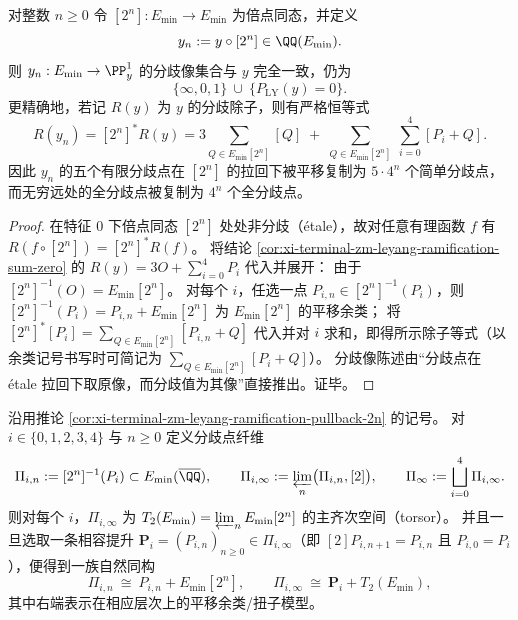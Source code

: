 \begin{corollary}\label{cor:xi-terminal-zm-leyang-ramification-pullback-2n}
对整数 \(n\ge 0\) 令 \([2^n]:E_{\min}\to E_{\min}\) 为倍点同态，并定义
\[
y_n:=y\circ[2^n]\in \QQ(E_{\min}).
\]
则 \(y_n:E_{\min}\to\PP^1_y\) 的分歧像集合与 \(y\) 完全一致，仍为
\[
\{\infty,0,1\}\ \cup\ \{P_{\mathrm{LY}}(y)=0\}.
\]
更精确地，若记 \(R(y)\) 为 \(y\) 的分歧除子，则有严格恒等式
\[
R(y_n)=[2^n]^*R(y)
=3\sum_{Q\in E_{\min}[2^n]}[Q]\;+\;\sum_{Q\in E_{\min}[2^n]}\ \sum_{i=0}^{4}[P_i+Q].
\]
因此 \(y_n\) 的五个有限分歧点在 \([2^n]\) 的拉回下被平移复制为 \(5\cdot 4^n\) 个简单分歧点，而无穷远处的全分歧点被复制为 \(4^n\) 个全分歧点。
\end{corollary}
\begin{proof}
在特征 \(0\) 下倍点同态 \([2^n]\) 处处非分歧（\'etale），故对任意有理函数 \(f\) 有 \(R(f\circ[2^n])=[2^n]^*R(f)\)。
将结论 \ref{cor:xi-terminal-zm-leyang-ramification-sum-zero} 的 \(R(y)=3O+\sum_{i=0}^{4}P_i\) 代入并展开：
由于 \([2^n]^{-1}(O)=E_{\min}[2^n]\)。
对每个 \(i\)，任选一点 \(P_{i,n}\in[2^n]^{-1}(P_i)\)，则 \([2^n]^{-1}(P_i)=P_{i,n}+E_{\min}[2^n]\) 为 \(E_{\min}[2^n]\) 的平移余类；
将 \([2^n]^*[P_i]=\sum_{Q\in E_{\min}[2^n]}[P_{i,n}+Q]\) 代入并对 \(i\) 求和，即得所示除子等式（以余类记号书写时可简记为 \(\sum_{Q\in E_{\min}[2^n]}[P_i+Q]\)）。
分歧像陈述由“分歧点在 \'etale 拉回下取原像，而分歧值为其像”直接推出。证毕。
\end{proof}

\begin{corollary}\label{cor:xi-terminal-zm-leyang-branchpoint-tate-torsor-decomposition}
沿用推论 \ref{cor:xi-terminal-zm-leyang-ramification-pullback-2n} 的记号。
对 \(i\in\{0,1,2,3,4\}\) 与 \(n\ge 0\) 定义分歧点纤维
\[
\Pi_{i,n}:=[2^n]^{-1}(P_i)\subset E_{\min}(\overline{\QQ}),
\qquad
\Pi_{i,\infty}:=\varprojlim_n\bigl(\Pi_{i,n},[2]\bigr),
\qquad
\Pi_\infty:=\bigsqcup_{i=0}^{4}\Pi_{i,\infty}.
\]
则对每个 \(i\)，\(\Pi_{i,\infty}\) 为 \(T_2(E_{\min})=\varprojlim_n E_{\min}[2^n]\) 的主齐次空间（torsor）。
并且一旦选取一条相容提升 \(\mathbf P_i=(P_{i,n})_{n\ge 0}\in \Pi_{i,\infty}\)（即 \([2]P_{i,n+1}=P_{i,n}\) 且 \(P_{i,0}=P_i\)），便得到一族自然同构
\[
\Pi_{i,n}\ \cong\ P_{i,n}+E_{\min}[2^n],
\qquad
\Pi_{i,\infty}\ \cong\ \mathbf P_i+T_2(E_{\min}),
\]
其中右端表示在相应层次上的平移余类/扭子模型。
\end{corollary}

